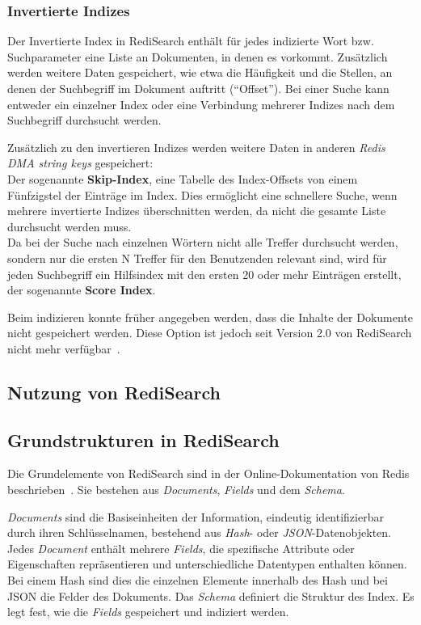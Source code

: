 \subsubsection{Invertierte Indizes}
Der Invertierte Index in RediSearch enthält für jedes indizierte Wort bzw. Suchparameter eine Liste an Dokumenten, in denen es vorkommt.
Zusätzlich werden weitere Daten gespeichert, wie etwa die Häufigkeit und die Stellen, an denen der Suchbegriff im Dokument auftritt (\enquote{Offset}).
Bei einer Suche kann entweder ein einzelner Index oder eine Verbindung mehrerer Indizes nach dem Suchbegriff durchsucht werden.

Zusätzlich zu den invertieren Indizes werden weitere Daten in anderen \textit{Redis DMA string keys} gespeichert:\\
Der sogenannte \textbf{Skip-Index}, eine Tabelle des Index-Offsets von einem Fünfzigstel der Einträge im Index. Dies ermöglicht eine schnellere Suche, wenn mehrere invertierte Indizes überschnitten werden, da nicht die gesamte Liste durchsucht werden muss.\\
Da bei der Suche nach einzelnen Wörtern nicht alle Treffer durchsucht werden, sondern nur die ersten N Treffer für den Benutzenden relevant sind, wird für jeden Suchbegriff ein Hilfsindex mit den ersten 20 oder mehr Einträgen erstellt, der sogenannte \textbf{Score Index}.

Beim indizieren konnte früher angegeben werden, dass die Inhalte der Dokumente nicht gespeichert werden. Diese Option ist jedoch seit Version 2.0 von RediSearch nicht mehr verfügbar~\cite{redis_ltd_upgrade_nodate, korland_missing_nodate}.

\subsection{Nutzung von RediSearch} %

\subsection{Grundstrukturen in RediSearch}
Die Grundelemente von RediSearch sind in der Online-Dokumentation von Redis beschrieben~\cite{redis_ltd_basic_nodate}.
Sie bestehen aus \emph{Documents}, \emph{Fields} und dem \emph{Schema}.

\emph{Documents} sind die Basiseinheiten der Information, eindeutig identifizierbar durch ihren Schlüsselnamen, bestehend aus \emph{Hash}- oder \emph{JSON}-Datenobjekten. Jedes \emph{Document} enthält mehrere \emph{Fields}, die spezifische Attribute oder Eigenschaften repräsentieren und unterschiedliche Datentypen enthalten können. Bei einem Hash sind dies die einzelnen Elemente innerhalb des Hash und bei JSON die Felder des Dokuments.
Das \emph{Schema} definiert die Struktur des Index. Es legt fest, wie die \emph{Fields} gespeichert und indiziert werden.

